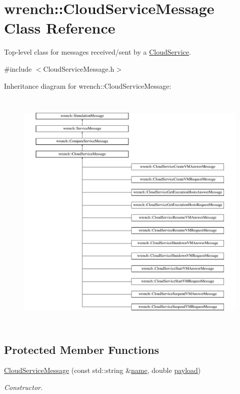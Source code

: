 \hypertarget{classwrench_1_1_cloud_service_message}{}\section{wrench\+:\+:Cloud\+Service\+Message Class Reference}
\label{classwrench_1_1_cloud_service_message}


Top-\/level class for messages received/sent by a \hyperlink{classwrench_1_1_cloud_service}{Cloud\+Service}.  




{\ttfamily \#include $<$Cloud\+Service\+Message.\+h$>$}

Inheritance diagram for wrench\+:\+:Cloud\+Service\+Message\+:\begin{figure}[H]
\begin{center}
\leavevmode
\includegraphics[height=12.000000cm]{classwrench_1_1_cloud_service_message}
\end{center}
\end{figure}
\subsection*{Protected Member Functions}
\begin{DoxyCompactItemize}
\item 
\hyperlink{classwrench_1_1_cloud_service_message_a6092eea84d989b5ff4df06db6db5927d}{Cloud\+Service\+Message} (const std\+::string \&\hyperlink{classwrench_1_1_simulation_message_ab224f6dd8ec5ee2e7f65bfcdf2b8a86b}{name}, double \hyperlink{classwrench_1_1_simulation_message_a914f2732713f7c02898e66f05a7cb8a1}{payload})
\begin{DoxyCompactList}\small\item\em Constructor. \end{DoxyCompactList}\end{DoxyCompactItemize}
